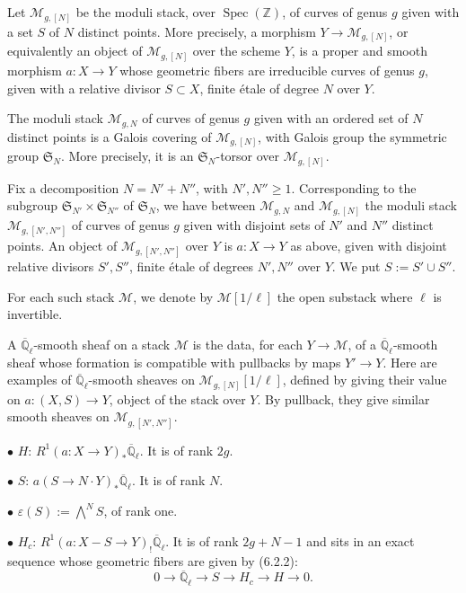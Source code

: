 \documentclass[11pt,a4paper]{article}
\theoremstyle{plain}
\theoremstyle{definition}
\DeclareMathOperator{\Spec}{Spec}
\newcommand{\Ql}{\overline{\mathbb{Q}}_\ell}
\newcommand{\Z}{\mathbb{Z}}
\begin{document}
\subsection{}
Let $\mathcal{M}_{g,[N]}$ be the moduli stack, over $\Spec(\Z)$, of curves of genus $g$ given with a set $S$ of $N$ distinct points. More precisely, a morphism $Y \to \mathcal{M}_{g,[N]}$, or equivalently an object of $\mathcal{M}_{g,[N]}$ over the scheme $Y$, is a proper and smooth morphism $a: X \to Y$ whose geometric fibers are irreducible curves of genus $g$, given with a relative divisor $S \subset X$, finite \'etale of degree $N$ over $Y$.

The moduli stack $\mathcal{M}_{g,N}$ of curves of genus $g$ given with an ordered set of $N$ distinct points is a Galois covering of $\mathcal{M}_{g,[N]}$, with Galois group the symmetric group $\mathfrak{S}_N$. More precisely, it is an $\mathfrak{S}_N$-torsor over $\mathcal{M}_{g,[N]}$.

Fix a decomposition $N = N' + N''$, with $N', N'' \geq 1$. Corresponding to the subgroup $\mathfrak{S}_{N'} \times \mathfrak{S}_{N''}$ of $\mathfrak{S}_N$, we have between $\mathcal{M}_{g,N}$ and $\mathcal{M}_{g,[N]}$ the moduli stack $\mathcal{M}_{g,[N',N'']}$ of curves of genus $g$ given with disjoint sets of $N'$ and $N''$ distinct points. An object of $\mathcal{M}_{g,[N',N'']}$ over $Y$ is $a: X \to Y$ as above, given with disjoint relative divisors $S', S''$, finite \'etale of degrees $N', N''$ over $Y$. We put $S := S' \cup S''$.

For each such stack $\mathcal{M}$, we denote by $\mathcal{M}[1/\ell]$ the open substack where $\ell$ is invertible.

A $\Ql$-smooth sheaf on a stack $\mathcal{M}$ is the data, for each $Y \to \mathcal{M}$, of a $\Ql$-smooth sheaf whose formation is compatible with pullbacks by maps $Y' \to Y$. Here are examples of $\Ql$-smooth sheaves on $\mathcal{M}_{g,[N]}[1/\ell]$, defined by giving their value on $a: (X, S) \to Y$, object of the stack over $Y$. By pullback, they give similar smooth sheaves on $\mathcal{M}_{g,[N',N'']}$.

$\bullet$ $H$: $R^1(a: X \to Y)_* \Ql$. It is of rank $2g$.

$\bullet$ $S$: $a(S \to N \cdot Y)_* \Ql$. It is of rank $N$.

$\bullet$ $\varepsilon(S) := \bigwedge^N S$, of rank one.

$\bullet$ $H_c$: $R^1(a: X - S \to Y)_! \Ql$. It is of rank $2g + N - 1$ and sits in an exact sequence whose geometric fibers are given by (6.2.2):
\begin{equation}
0 \to \Ql \to S \to H_c \to H \to 0. \tag{6.27.1}
\end{equation}
\end{document}

